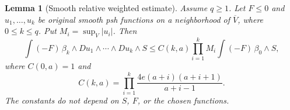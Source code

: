 \documentclass[11pt,a4paper]{article}
\numberwithin{equation}{section}
\newtheorem{lemma}[theorem]{Lemma}
\theoremstyle{definition}
\theoremstyle{remark}
\begin{document}
\begin{lemma}[Smooth relative weighted estimate]
\label{lem:r2-smooth-weighted-cln}
Assume $q\geq1$. Let $F\leq0$ and $u_1,\ldots,u_k$ be original
smooth psh functions on a neighborhood of $\overline V$, where
$0\leq k\leq q$. Put $M_i=\sup_V|u_i|$. Then
\begin{equation}
\label{eq:r2-smooth-l1}
 \int(-F)\,\beta_k\wedge Du_1\wedge\cdots\wedge Du_k\wedge S
 \leq C(k,a)\prod_{i=1}^kM_i
                 \int(-F)\,\beta_0\wedge S,
\end{equation}
where $C(0,a)=1$ and
\begin{equation}
\label{eq:r2-constant}
 C(k,a)=\prod_{i=1}^{k}
           \frac{4e(a+i)(a+i+1)}{a+i-1}.
\end{equation}
The constants do not depend on $S$, $F$, or the chosen functions.
\end{lemma}
\end{document}
